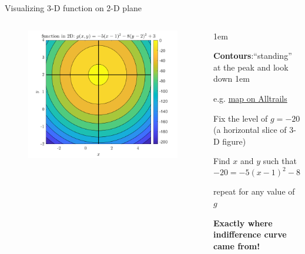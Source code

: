 \documentclass[11pt,aspectratio=43]{beamer}
\let\olditemize=\itemize
\let\endolditemize=\enditemize
\renewenvironment{itemize}{\olditemize \itemsep1em}{\endolditemize}
\theoremstyle{definition}
\begin{document}
\begin{frame}{Visualizing 3-D function on 2-D plane}
\label{slide:Visualizing_3_D_function_on_2_D_plane}

    \begin{columns}
        \begin{column}{0.5\textwidth}
            \begin{figure}
                \includegraphics[width=\textwidth]{./figures/2VarContours.png}
            \end{figure}
        \end{column}
        \begin{column}{0.5\textwidth}
            \begin{itemize}
                \item \textbf{Contours}:``standing'' at the peak and look down
                \begin{itemize}
                    \item e.g. \alert{\href{https://www.alltrails.com/}{map on Alltrails}}
                \end{itemize}
                \item Fix the level of $ g = -20 $ (a \alert{horizontal slice} of 3-D figure)
                \item Find $ x $ and $ y $ such that
                \begin{equation*}
                     -20 = -5( x-1 )^{2} - 8( y-2 )^{2} + 3
                \end{equation*}
                \item repeat for any value of $ g $
                \item \textbf{Exactly where indifference curve came from!}
            \end{itemize}
        \end{column}
    \end{columns}
\end{frame}
\end{document}
